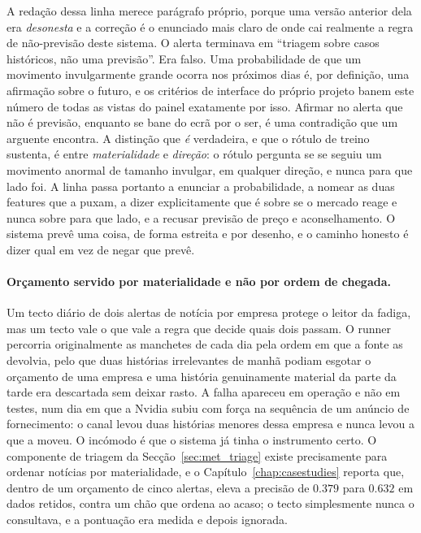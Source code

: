 A redação dessa linha merece parágrafo próprio, porque uma versão anterior dela era \emph{desonesta} e a
correção é o enunciado mais claro de onde cai realmente a regra de não-previsão deste sistema. O alerta
terminava em ``triagem sobre casos históricos, não uma previsão''. Era falso. Uma probabilidade de que um
movimento invulgarmente grande ocorra nos próximos dias é, por definição, uma afirmação sobre o futuro, e
os critérios de interface do próprio projeto banem este número de todas as vistas do painel exatamente por
isso. Afirmar no alerta que não é previsão, enquanto se bane do ecrã por o ser, é uma contradição que um
arguente encontra. A distinção que \emph{é} verdadeira, e que o rótulo de treino sustenta, é entre
\emph{materialidade} e \emph{direção}: o rótulo pergunta se se seguiu um movimento anormal de tamanho
invulgar, em qualquer direção, e nunca para que lado foi. A linha passa portanto a enunciar a
probabilidade, a nomear as duas features que a puxam, a dizer explicitamente que é sobre se o mercado
reage e nunca sobre para que lado, e a recusar previsão de preço e aconselhamento. O sistema prevê uma
coisa, de forma estreita e por desenho, e o caminho honesto é dizer qual em vez de negar que prevê.

\paragraph{Orçamento servido por materialidade e não por ordem de chegada.} Um tecto diário de dois
alertas de notícia por empresa protege o leitor da fadiga, mas um tecto vale o que vale a regra que
decide quais dois passam. O runner percorria originalmente as manchetes de cada dia pela ordem em que
a fonte as devolvia, pelo que duas histórias irrelevantes de manhã podiam esgotar o orçamento de uma
empresa e uma história genuinamente material da parte da tarde era descartada sem deixar rasto. A
falha apareceu em operação e não em testes, num dia em que a Nvidia subiu com força na sequência de
um anúncio de fornecimento: o canal levou duas histórias menores dessa empresa e nunca levou a que
a moveu. O incómodo é que o sistema já tinha o instrumento certo. O componente de triagem da
Secção~\ref{sec:met_triage} existe precisamente para ordenar notícias por materialidade, e o
Capítulo~\ref{chap:casestudies} reporta que, dentro de um orçamento de cinco alertas, eleva a precisão de
$0.379$ para $0.632$ em dados retidos, contra um chão que ordena ao acaso; o tecto simplesmente nunca o
consultava, e a pontuação era medida e depois ignorada.


